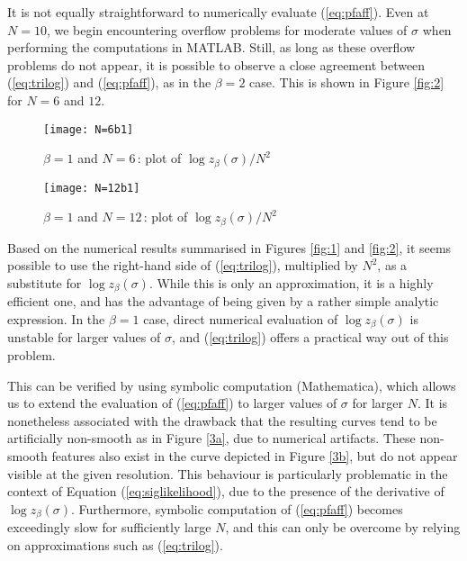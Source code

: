 \documentclass[draftclsnofoot]{IEEEtran}
\begin{document}
It is not equally straightforward to numerically evaluate (\ref{eq:pfaff}). Even at $N=10$, we begin encountering overflow problems for moderate values of $\sigma$ when performing the computations in MATLAB.
Still, as long as these overflow problems do not appear, it is possible to observe a close agreement between (\ref{eq:trilog}) and (\ref{eq:pfaff}), as in the $\beta = 2$ case. This is shown in Figure \ref{fig:2} for $N = 6$ and $12$.
\begin{figure*}[t]
    \centering
    \begin{subfigure}[b]{0.475\textwidth}
        \centering
        \texttt{[image: N=6b1]}
        \caption{$\beta = 1$ and $N = 6$\,: plot of $\log z_\beta(\sigma)/N^2$}
    \end{subfigure}
    \quad
    \begin{subfigure}[b]{0.475\textwidth}  
        \centering 
        \texttt{[image: N=12b1]}
        \caption{$\beta = 1$ and $N = 12$\,: plot of $\log z_\beta(\sigma)/N^2$}
    \end{subfigure}
    \caption{Proposition \ref{prop:trilog} ($\beta = 1$)\,: (\ref{eq:trilog}) in dashed red and (\ref{eq:pfaff}) in solid blue}
\label{fig:2}
\end{figure*}

Based on the numerical results summarised in Figures \ref{fig:1} and \ref{fig:2}, it seems possible to use the right-hand side of (\ref{eq:trilog}), multiplied by $N^2$, as a substitute for $\log z_\beta(\sigma)$. While this is only an approximation, it is a highly efficient one, and has the advantage of being given by a rather simple analytic expression. In the $\beta = 1$ case, direct numerical evaluation of $\log z_\beta(\sigma)$ is unstable for larger values of $\sigma$, and (\ref{eq:trilog}) offers a practical way out of this problem. 

This can be verified by using symbolic computation (Mathematica), which allows us to extend the evaluation of (\ref{eq:pfaff}) to larger values of $\sigma$ for larger $N$. It is nonetheless associated with the drawback that the resulting curves tend to be artificially non-smooth as in Figure \ref{3a}, due to numerical artifacts. These non-smooth features also exist in the curve depicted in Figure \ref{3b}, but do not appear visible at the given resolution. This behaviour is particularly problematic in the context of Equation (\ref{eq:siglikelihood}), due to the presence of the derivative of $\log z_{\beta}(\sigma)$. Furthermore, symbolic computation of (\ref{eq:pfaff}) becomes exceedingly slow for sufficiently large $N$, and this can only be overcome by relying on approximations such as (\ref{eq:trilog}).
   
\end{document}
